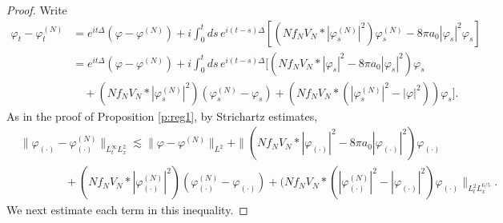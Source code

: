 \documentclass[11pt,a4paper]{scrartcl} %
\begin{document}
\begin{proof}
  Write
  \begin{align*}
    \varphi_t - \varphi_t^{(N)} & = e^{it\Delta}(\varphi - \varphi^{(N)}) + i
    \int_0^t ds \, e^{i(t-s) \Delta} [ (N f_N V_N * |\varphi_s^{(N)}|^2)
    \varphi_s^{(N)} - 8 \pi a_0 |\varphi_s|^2 \varphi_s ] \\
    & = e^{it\Delta}(\varphi - \varphi^{(N)}) + i \int_0^t ds \, e^{i(t-s)
    \Delta} [ (N f_N V_N * |\varphi_s|^2 - 8 \pi a_0 |\varphi_s|^2) \varphi_s
    \\
    & \quad + (N f_N V_N * |\varphi_s^{(N)}|^2)(\varphi_s^{(N)} - \varphi_s) +
    (N f_N V_N * (|\varphi_s^{(N)}|^2 - |\varphi|^2)) \varphi_s].
  \end{align*}
  As in the proof of Proposition \ref{p:reg1}, by Strichartz estimates,
  \begin{equation}
    \begin{aligned}
      & \| \varphi_{(\cdot)} - \varphi_{(\cdot)}^{(N)} \|_{L_t^\infty L_x^2}
      \apprle \| \varphi - \varphi^{(N)} \|_{L^2} + \| (N f_N V_N *
      |\varphi_{(\cdot)}|^2 - 8 \pi a_0 |\varphi_{(\cdot)}|^2)
      \varphi_{(\cdot)} \\
      & \qquad \qquad + (N f_N V_N * |\varphi_{(\cdot)}^{(N)}|^2)(\varphi_{(\cdot)}^{(N)} -
      \varphi_{(\cdot)})+ (N f_N V_N * (|\varphi_{(\cdot)}^{(N)}|^2 -
      |\varphi_{(\cdot)}|^2) \varphi_{(\cdot)} \|_{L_t^2 L_x^{6/5}}.
    \end{aligned}
    \label{diff}
  \end{equation}
  We next estimate each term in this inequality.



\end{proof}
\end{document}

